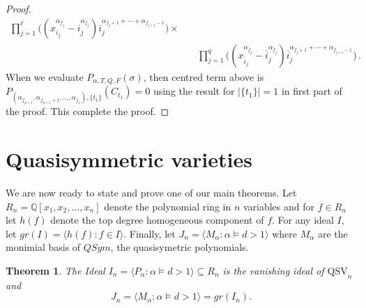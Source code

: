 \documentclass[12pt]{amsart}
\newtheorem{thm}[equation]{Theorem}
\theoremstyle{definition}
\theoremstyle{remark}
\numberwithin{equation}{section}
\newcommand{\QQ}{\mathbb{Q}}
\newcommand{\QSV}{\mathrm{QSV}}
\begin{document}
\begin{proof}
\begin{align*}
		\prod_{j=1}^\ell 
	     	\Big( (x_{i_j}^{\alpha_{f_j}}- i_j^{\alpha_{f_j }})  i_j^{\alpha_{f_j +1}+\cdots+\alpha_{f_{j +1}-1}} \Big)\times\\
		&\quad\prod_{j=1}^q 
	     	\Big( (x_{\overline{i}_j}^{\alpha_{\overline{f}_j}}-\overline{i}_j^{\alpha_{\overline{f}_j }})  \overline{i}_j^{\alpha_{\overline{f}_j +1}+\cdots+\alpha_{\overline{f}_{j +1}-1}} \Big) \,.
\end{align*}
When we evaluate $P_{\alpha,T,Q,F}(\sigma)$, then centred term above is $P_{(\alpha_{\underline{f}_{p+1}}, \alpha_{\underline{f}_{p+1}+1} , \ldots, \alpha_{\overline{f}_1} ),\{t_1\}}(C_{t_1})=0$ using the result for $|\{t_1\}|=1$ in first part of the proof. This complete the proof.
\end{proof}


\section{Quasisymmetric varieties}
\label{sec:finalthm}


We are now ready to state and prove one of our main theorems. Let $R_n=\QQ[x_1,x_2,\ldots,x_n]$ denote the polynomial ring in $n$ variables and for $f\in R_n$ let $h(f)$ denote
the top degree homogeneous component of $f$. For any ideal $I$, let $gr(I)=\langle h(f) : f\in I \rangle$. Finally, let $J_n=\langle M_\alpha : \alpha\models d>1 \rangle$ where $M_\alpha$ are the monimial basis of $QSym$, the quasisymetric  polynomials.

\begin{thm}\label{thm:vanishingQSV} The Ideal $I_n=\langle P_\alpha : \alpha\models d>1\rangle\subseteq R_n$ is the vanishing ideal of $\QSV_n$ and 
 $$J_n=\langle M_\alpha : \alpha\models d>1\rangle = gr(I_n).$$
 \end{thm}
\end{document}
